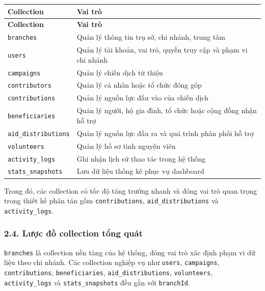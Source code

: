 \documentclass[12pt,a4paper]{article}
\begin{document}
\begin{center}
\small
\begin{longtable}{|p{3.5cm}|p{9cm}|}
\hline
\textbf{Collection} & \textbf{Vai trò} \\ \hline
\endfirsthead
\hline
\textbf{Collection} & \textbf{Vai trò} \\ \hline
\endhead
\texttt{branches} & Quản lý thông tin trụ sở, chi nhánh, trung tâm \\ \hline
\texttt{users} & Quản lý tài khoản, vai trò, quyền truy cập và phạm vi chi nhánh \\ \hline
\texttt{campaigns} & Quản lý chiến dịch từ thiện \\ \hline
\texttt{contributors} & Quản lý cá nhân hoặc tổ chức đóng góp \\ \hline
\texttt{contributions} & Quản lý nguồn lực đầu vào của chiến dịch \\ \hline
\texttt{beneficiaries} & Quản lý người, hộ gia đình, tổ chức hoặc cộng đồng nhận hỗ trợ \\ \hline
\texttt{aid\_distributions} & Quản lý nguồn lực đầu ra và quá trình phân phối hỗ trợ \\ \hline
\texttt{volunteers} & Quản lý hồ sơ tình nguyện viên \\ \hline
\texttt{activity\_logs} & Ghi nhận lịch sử thao tác trong hệ thống \\ \hline
\texttt{stats\_snapshots} & Lưu dữ liệu thống kê phục vụ dashboard \\ \hline
\end{longtable}
\normalsize
\end{center}

Trong đó, các collection có tốc độ tăng trưởng nhanh và đóng vai trò quan trọng trong thiết kế phân tán gồm \texttt{contributions}, \texttt{aid\_distributions} và \texttt{activity\_logs}.

\subsubsection*{2.4. Lược đồ collection tổng quát}

\texttt{branches} là collection nền tảng của hệ thống, đóng vai trò xác định phạm vi dữ liệu theo chi nhánh. Các collection nghiệp vụ như \texttt{users}, \texttt{campaigns}, \texttt{contributions}, \texttt{beneficiaries}, \texttt{aid\_distributions}, \texttt{volunteers}, \texttt{activity\_logs} và \texttt{stats\_snapshots} đều gắn với \texttt{branchId}.
\end{document}
